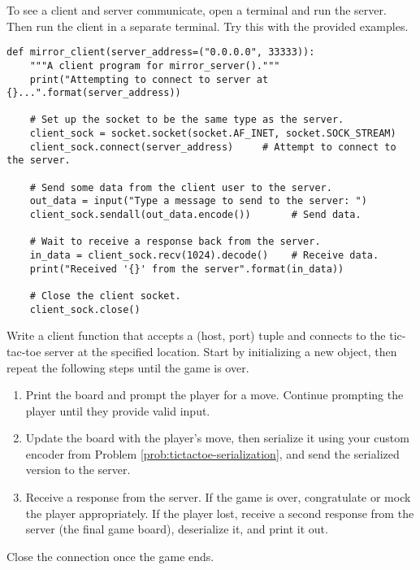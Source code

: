 To see a client and server communicate, open a terminal and run the server.
Then run the client in a separate terminal.
Try this with the provided examples.

\vspace{2mm}
\begin{lstlisting}
def mirror_client(server_address=("0.0.0.0", 33333)):
    """A client program for mirror_server()."""
    print("Attempting to connect to server at {}...".format(server_address))
   
    # Set up the socket to be the same type as the server.
    client_sock = socket.socket(socket.AF_INET, socket.SOCK_STREAM)
    client_sock.connect(server_address)     # Attempt to connect to the server.
    
    # Send some data from the client user to the server.
    out_data = input("Type a message to send to the server: ")
    client_sock.sendall(out_data.encode())       # Send data.
   
    # Wait to receive a response back from the server.
    in_data = client_sock.recv(1024).decode()    # Receive data.
    print("Received '{}' from the server".format(in_data))
   
    # Close the client socket.
    client_sock.close()
\end{lstlisting}

\begin{problem}
Write a client function that accepts a (host, port) tuple and connects to the tic-tac-toe server at the specified location.
Start by initializing a new  object, then repeat the following steps until the game is over.
\begin{enumerate}
\item Print the board and prompt the player for a move.
Continue prompting the player until they provide valid input.
\item Update the board with the player's move, then serialize it using your custom encoder from Problem \ref{prob:tictactoe-serialization}, and send the serialized version to the server.
\item Receive a response from the server.
If the game is over, congratulate or mock the player appropriately.
If the player lost, receive a second response from the server (the final game board), deserialize it, and print it out.
\end{enumerate}
Close the connection once the game ends.
\label{prob:tictactoe-client}
\end{problem}

